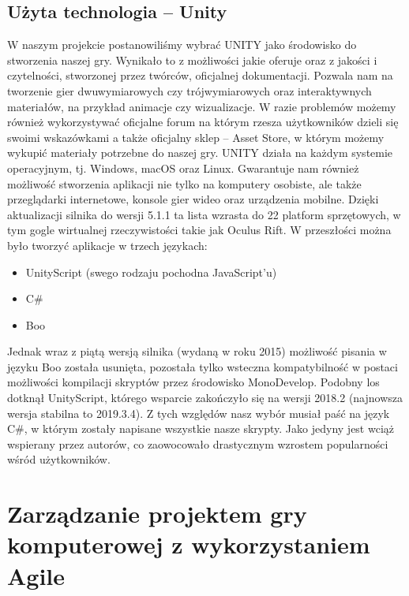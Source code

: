 \documentclass[oneside,polski,logo]{amuthesis}
\begin{document}
\section{Użyta technologia – Unity}
 W naszym projekcie postanowiliśmy wybrać UNITY jako środowisko do stworzenia naszej gry. Wynikało to z możliwości jakie oferuje oraz z jakości i czytelności, stworzonej przez twórców, oficjalnej dokumentacji. Pozwala nam na tworzenie gier dwuwymiarowych czy trójwymiarowych oraz interaktywnych materiałów, na przykład animacje czy wizualizacje. W razie problemów możemy również wykorzystywać oficjalne forum na którym rzesza użytkowników dzieli się swoimi wskazówkami a także oficjalny sklep – Asset Store, w którym możemy wykupić materiały potrzebne do naszej gry. UNITY działa na każdym systemie operacyjnym, tj. Windows, macOS oraz Linux. Gwarantuje nam również możliwość stworzenia aplikacji nie tylko na komputery osobiste, ale także przeglądarki internetowe, konsole gier wideo oraz urządzenia mobilne. Dzięki aktualizacji silnika do wersji 5.1.1 ta lista wzrasta do 22 platform sprzętowych, w tym gogle wirtualnej rzeczywistości takie jak Oculus Rift.
W przeszłości można było tworzyć aplikacje w trzech językach:
\begin{itemize}
	\item UnityScript (swego rodzaju pochodna JavaScript’u)
	\item C\#
	\item Boo
\end{itemize}
Jednak wraz z piątą wersją silnika (wydaną w roku 2015) możliwość pisania w języku Boo została usunięta, pozostała tylko wsteczna kompatybilność w postaci możliwości kompilacji skryptów przez środowisko MonoDevelop. Podobny los dotknął UnityScript, którego wsparcie zakończyło się na wersji 2018.2 (najnowsza wersja stabilna to 2019.3.4). Z tych względów nasz wybór musiał paść na język C\#, w którym zostały napisane wszystkie nasze skrypty. Jako jedyny jest wciąż wspierany przez autorów, co zaowocowało drastycznym wzrostem popularności wśród użytkowników.\cite{unity}

\chapter{Zarządzanie projektem gry komputerowej z wykorzystaniem Agile}
\end{document}

